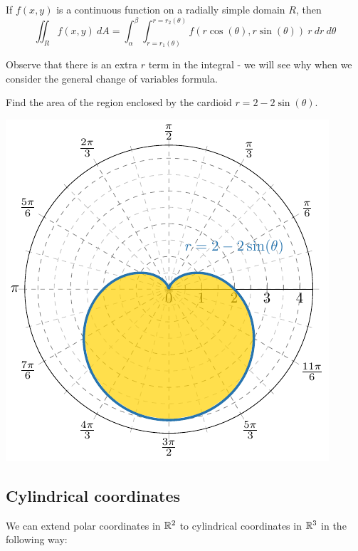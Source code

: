 \begin{theorem}
If $f(x,y)$ is a continuous function on a radially simple domain $R$, then $$\iint_R f(x,y) \ dA = \int_\alpha^\beta \int_{r= r_1(\theta)}^{r= r_2(\theta)} f(r\cos(\theta), r\sin(\theta)) \ r \ dr \ d\theta$$
\end{theorem}

\begin{remark}
    Observe that there is an extra $r$ term in the integral - we will see why when we consider the general change of variables formula.
\end{remark}

\begin{example}
    Find the area of the region enclosed by the cardioid $r = 2 - 2\sin(\theta)$.

\begin{center}
        \includegraphics{chapters/4-IntegrationRn/figures/figures-cardioid.pdf}
    \end{center}
\end{example}

\subsection{Cylindrical coordinates}

We can extend polar coordinates in $\mathbb{R}^2$ to cylindrical coordinates in $\mathbb{R}^3$ in the following way:

